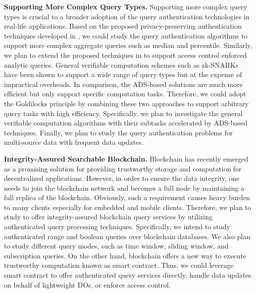 \textbf{Supporting More Complex Query Types.}
Supporting more complex query types is crucial to a broader adoption of the query authentication technologies in real-life applications.
Based on the proposed privacy-preserving authentication techniques developed in , we could study the query authentication algorithms to support more complex aggregate queries such as median and percentile. Similarly, we plan to extend the proposed techniques in  to support access control enforced analytic queries. General verifiable computation schemes such as zk-SNARKs have been shown to support a wide range of query types but at the expense of impractical overheads. In comparison, the ADS-based solutions are much more efficient but only support specific computation tasks. Therefore, we could adopt the Goldilocks principle by combining these two approaches to support arbitrary query tasks with high efficiency. Specifically, we plan to investigate the general verifiable computation algorithms with their subtasks accelerated by ADS-based techniques. Finally, we plan to study the query authentication problems for multi-source data with frequent data updates.

\textbf{Integrity-Assured Searchable Blockchain.}
Blockchain has recently emerged as a promising solution for providing trustworthy storage and computation for decentralized applications. However, in order to ensure the data integrity, one needs to join the blockchain network and becomes a full node by maintaining a full replica of the blockchain. Obviously, such a requirement causes heavy burden to many clients especially for embedded and mobile clients. Therefore, we plan to study to offer integrity-assured blockchain query services by utilizing authenticated query processing techniques. Specifically, we intend to study authenticated range and boolean queries over blockchain databases. We also plan to study different query modes, such as time window, sliding window, and subscription queries. On the other hand, blockchain offers a new way to execute trustworthy computation known as smart contract. Thus, we could leverage smart contract to offer authenticated query services directly, handle data updates on behalf of lightweight DOs, or enforce access control.


